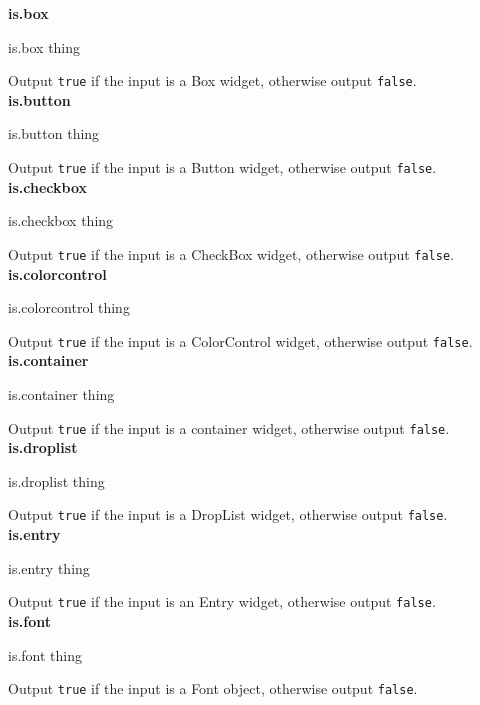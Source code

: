 {\bf is.box} 
\begin{verbatimtab}
is.box thing
\end{verbatimtab}
Output {\tt true} if the input is a Box widget, otherwise output {\tt false}.\\

{\bf is.button} 
\begin{verbatimtab}
is.button thing
\end{verbatimtab}
Output {\tt true} if the input is a Button widget, otherwise output {\tt false}.\\

{\bf is.checkbox} 
\begin{verbatimtab}
is.checkbox thing
\end{verbatimtab}
Output {\tt true} if the input is a CheckBox widget, otherwise output {\tt false}.\\

{\bf is.colorcontrol} 
\begin{verbatimtab}
is.colorcontrol thing
\end{verbatimtab}
Output {\tt true} if the input is a ColorControl widget, otherwise output {\tt false}.\\

{\bf is.container} 
\begin{verbatimtab}
is.container thing
\end{verbatimtab}
Output {\tt true} if the input is a container widget, otherwise output {\tt false}.\\

{\bf is.droplist} 
\begin{verbatimtab}
is.droplist thing
\end{verbatimtab}
Output {\tt true} if the input is a DropList widget, otherwise output {\tt false}.\\

{\bf is.entry} 
\begin{verbatimtab}
is.entry thing
\end{verbatimtab}
Output {\tt true} if the input is an Entry widget, otherwise output {\tt false}.\\

{\bf is.font} 
\begin{verbatimtab}
is.font thing
\end{verbatimtab}
Output {\tt true} if the input is a Font object, otherwise output {\tt false}.\\


